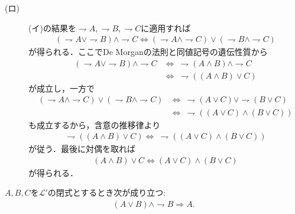 \begin{prf}
\begin{description}
			\item[(ロ)]
				(イ)の結果を$\rightharpoondown A,\rightharpoondown B,\rightharpoondown C$に適用すれば
				\begin{align}
					(\rightharpoondown A \vee \rightharpoondown B) \wedge \rightharpoondown C
					\Longleftrightarrow (\rightharpoondown A \wedge \rightharpoondown C) 
						\vee (\rightharpoondown B \wedge \rightharpoondown C)
				\end{align}
				が得られる．ここでDe Morganの法則と同値記号の遺伝性質から
				\begin{align}
					(\rightharpoondown A \vee \rightharpoondown B) \wedge \rightharpoondown C
					&\Longleftrightarrow\ \rightharpoondown (A \wedge B) \wedge \rightharpoondown C \\
					&\Longleftrightarrow\ \rightharpoondown ((A \wedge B) \vee C)
				\end{align}
				が成立し，一方で
				\begin{align}
					(\rightharpoondown A \wedge \rightharpoondown C) 
						\vee (\rightharpoondown B \wedge \rightharpoondown C)
					&\Longleftrightarrow\ \rightharpoondown (A \vee C) \vee \rightharpoondown (B \vee C) \\
					&\Longleftrightarrow\ \rightharpoondown ((A \vee C) \wedge (B \vee C))
				\end{align}
				も成立するから，含意の推移律より
				\begin{align}
					\rightharpoondown ((A \wedge B) \vee C)
					\Longleftrightarrow\ \rightharpoondown ((A \vee C) \wedge (B \vee C))
				\end{align}
				が従う．最後に対偶を取れば
				\begin{align}
					(A \wedge B) \vee C \Longleftrightarrow (A \vee C) \wedge (B \vee C)
				\end{align}
				が得られる．
				\QED
		\end{description}
	\end{prf}
	
	\begin{screen}
		\begin{metathm}[選言三段論法]\label{metathm:disjunctive_syllogism}
			$A,B,C$を$\mathcal{L}'$の閉式とするとき次が成り立つ:
			\begin{align}
				(A \vee B) \wedge \rightharpoondown B \Longrightarrow A.
			\end{align}
		\end{metathm}
	\end{screen}
	
